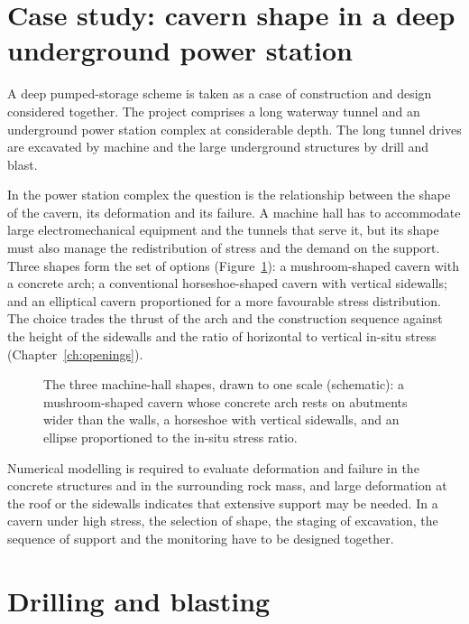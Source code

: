 \section{Case study: cavern shape in a deep underground power station}
\label{sec:case-deep-cavern}

A deep pumped-storage scheme is taken as a case of construction and design
considered together. The project comprises a long waterway tunnel and an
underground power station complex at considerable depth. The long tunnel
drives are excavated by machine and the large underground structures by
drill and blast.

In the power station complex the question is the relationship between the
shape of the cavern, its deformation and its failure. A machine hall has to
accommodate large electromechanical equipment and the tunnels that serve it,
but its shape must also manage the redistribution of stress and the demand on
the support. Three shapes form the set of options
(Figure~\ref{fig:cavern-shapes}): a mushroom-shaped cavern
with a concrete arch; a conventional horseshoe-shaped cavern with vertical
sidewalls; and an elliptical cavern proportioned for a more favourable stress
distribution. The choice trades the thrust of the arch and the construction
sequence against the height of the sidewalls and the ratio of horizontal to
vertical in-situ stress (Chapter~\ref{ch:openings}).

\begin{figure}[htbp]
\centering
{}
\caption{The three machine-hall shapes, drawn to one scale (schematic): a mushroom-shaped cavern whose concrete arch rests on abutments wider than the walls, a horseshoe with vertical sidewalls, and an ellipse proportioned to the in-situ stress ratio.}
\label{fig:cavern-shapes}
\end{figure}

Numerical modelling is required to evaluate deformation and failure in the
concrete structures and in the surrounding rock mass, and large deformation
at the roof or the sidewalls indicates that extensive support may be needed.
In a cavern under high stress, the selection of shape, the staging of
excavation, the sequence of support and the monitoring have to be designed
together.

\section{Drilling and blasting}
\label{sec:drilling-blasting}

